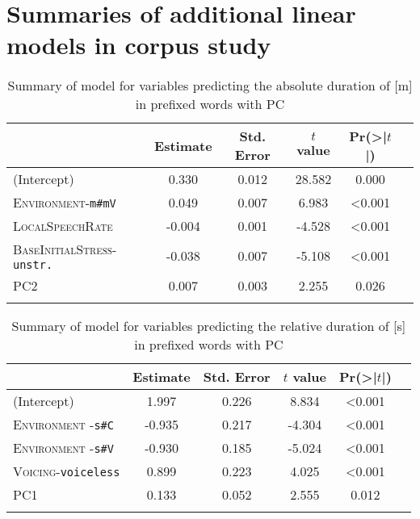 \chapter{Summaries of additional linear models in corpus study}\label{Appendix D: model summaries corpus}

\begin{table}
	\caption{Summary of model for variables predicting the absolute duration of [m] in prefixed words with PC\label{model im PC Corpus abs}}
	\begin{tabularx}{\textwidth}{XSSSSS}
				\lsptoprule
		   & {Estimate} & {Std. Error} & {$t$ value} & {Pr(>|$t$|)}  \\ \midrule
(Intercept)                        & 0.330 & 0.012 & 28.582 & 0.000 \\ 
\textsc{Environment}-\texttt{m\#mV}& 0.049 & 0.007 & 6.983 & <0.001\\ 
\textsc{LocalSpeechRate }& -0.004 & 0.001 & -4.528 & <0.001\\ 
\textsc{BaseInitialStress}-\texttt{unstr.} & -0.038 & 0.007 & -5.108 &  <0.001 \\ 
\textsc{PC2} & 0.007 & 0.003 & 2.255 & 0.026 \\
		\lspbottomrule 
			\end{tabularx}
\end{table}

\begin{table}
\caption{Summary of model for variables predicting the relative duration of [s] in prefixed words with PC\label{model dis PC Corpus rel}}
\begin{tabularx}{\textwidth}{XSSSSS}
\lsptoprule
		   & {Estimate} & {Std. Error} & {$t$ value} & {Pr(>|$t$|)}  \\ \midrule
(Intercept) & 1.997 & 0.226 & 8.834 & <0.001  \\ 
\textsc{Environment} -\texttt{s\#C}  & -0.935 & 0.217 & -4.304 &<0.001  \\ 
\textsc{Environment} -\texttt{s\#V} & -0.930 & 0.185 & -5.024 & <0.001  \\ 
\textsc{Voicing}-\texttt{voiceless} & 0.899 & 0.223 & 4.025 &   <0.001 \\ 
\textsc{PC1} & 0.133 & 0.052 & 2.555 & 0.012 \\ 
		\lspbottomrule 
			\end{tabularx}
\end{table}


